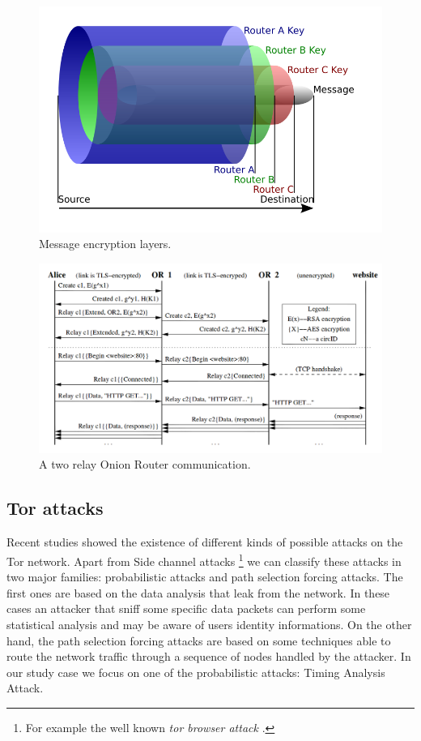 \begin{figure}[H]
    \centering
    \includegraphics[scale=0.35]{onion.png}
    \caption{Message encryption layers.}
    \label{fig:onion}
\end{figure}

\begin{figure}
	\centering
	\includegraphics[scale=0.35]{or-communication.png}
	\caption{A two relay Onion Router communication.\cite{dingledine2004tor}}
\end{figure}


\subsection{Tor attacks}
Recent studies showed the existence of different kinds
of possible attacks on the Tor network. 
Apart from Side channel attacks \footnote{For example the well known \emph{tor browser attack }.
}
we can classify these attacks in
two major families: probabilistic attacks and path selection forcing attacks.
The first ones are based on the data analysis that leak from the network. 
In these cases an attacker that sniff some specific data packets can perform some 
statistical analysis and may be aware of users identity informations.
On the other hand, the path selection forcing attacks are based on some techniques 
able to route the network traffic through a sequence of nodes handled by the attacker.
In our study case we focus on one of the probabilistic attacks: Timing Analysis Attack.
 
